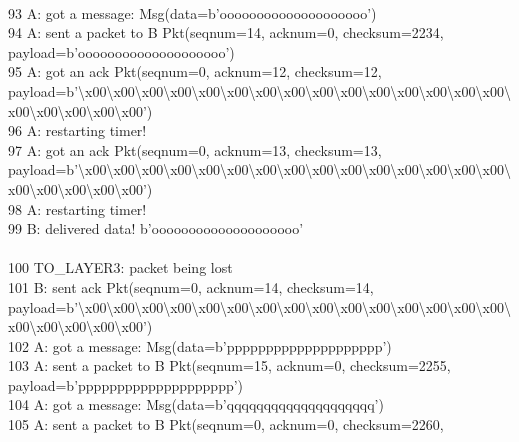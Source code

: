 \documentclass{article}
\begin{document}
{\\
93 A: got a message: Msg(data=b'oooooooooooooooooooo') \\
94 A: sent a packet to B Pkt(seqnum=14, acknum=0, checksum=2234,
payload=b'oooooooooooooooooooo') \\
95 A: got an ack Pkt(seqnum=0, acknum=12, checksum=12,
payload=b'\textbackslash{}x00\textbackslash{}x00\textbackslash{}x00\textbackslash{}x00\textbackslash{}x00\textbackslash{}x00\textbackslash{}x00\textbackslash{}x00\textbackslash{}x00\textbackslash{}x00\textbackslash{}x00\textbackslash{}x00\textbackslash{}x00\textbackslash{}x00\textbackslash{}x00\textbackslash{}x00\textbackslash{}x00\textbackslash{}x00\textbackslash{}x00\textbackslash{}x00')
\\
96 A: restarting timer! \\
97 A: got an ack Pkt(seqnum=0, acknum=13, checksum=13,
payload=b'\textbackslash{}x00\textbackslash{}x00\textbackslash{}x00\textbackslash{}x00\textbackslash{}x00\textbackslash{}x00\textbackslash{}x00\textbackslash{}x00\textbackslash{}x00\textbackslash{}x00\textbackslash{}x00\textbackslash{}x00\textbackslash{}x00\textbackslash{}x00\textbackslash{}x00\textbackslash{}x00\textbackslash{}x00\textbackslash{}x00\textbackslash{}x00\textbackslash{}x00')
\\
98 A: restarting timer! \\
99 B: delivered data! b'oooooooooooooooooooo' \\
 \\
100      \hspace*{10mm}     TO\_LAYER3: packet being lost \\
101 B: sent ack Pkt(seqnum=0, acknum=14, checksum=14,
payload=b'\textbackslash{}x00\textbackslash{}x00\textbackslash{}x00\textbackslash{}x00\textbackslash{}x00\textbackslash{}x00\textbackslash{}x00\textbackslash{}x00\textbackslash{}x00\textbackslash{}x00\textbackslash{}x00\textbackslash{}x00\textbackslash{}x00\textbackslash{}x00\textbackslash{}x00\textbackslash{}x00\textbackslash{}x00\textbackslash{}x00\textbackslash{}x00\textbackslash{}x00')
\\
102 A: got a message: Msg(data=b'pppppppppppppppppppp') \\
103 A: sent a packet to B Pkt(seqnum=15, acknum=0, checksum=2255,
payload=b'pppppppppppppppppppp') \\
104 A: got a message: Msg(data=b'qqqqqqqqqqqqqqqqqqqq') \\
105 A: sent a packet to B Pkt(seqnum=0, acknum=0, checksum=2260,
}
\end{document}
